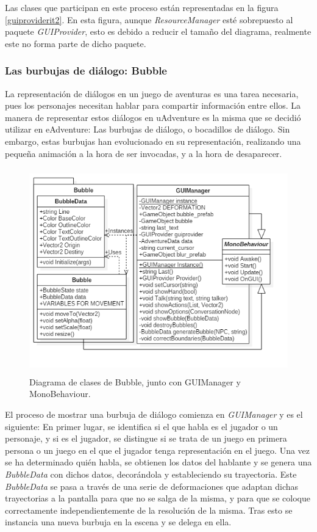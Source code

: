 Las clases que participan en este proceso están representadas en la figura \ref{guiproviderit2}. En esta figura, aunque \textit{ResourceManager} esté sobrepuesto al paquete \textit{GUIProvider}, esto es debido a reducir el tamaño del diagrama, realmente este no forma parte de dicho paquete.

\subsubsection{Las burbujas de diálogo: Bubble}

La representación de diálogos en un juego de aventuras es una tarea necesaria, pues los personajes necesitan hablar para compartir información entre ellos. La manera de representar estos diálogos en uAdventure es la misma que se decidió utilizar en eAdventure: Las burbujas de diálogo, o bocadillos de diálogo. Sin embargo, estas burbujas han evolucionado en su representación, realizando una pequeña animación a la hora de ser invocadas, y a la hora de desaparecer.

\begin{figure}[h!]
	\centerline{\includegraphics[height=3.5in]{figures/it2/Bubble.png}}
	\caption[Bubble - Versión Final]{Diagrama de clases de Bubble, junto con GUIManager y MonoBehaviour.}
	\label{bubbleit2}
\end{figure}

El proceso de mostrar una burbuja de diálogo comienza en \textit{GUIManager} y es el siguiente: En primer lugar, se identifica si el que habla es el jugador o un personaje, y si es el jugador, se distingue si se trata de un juego en primera persona o un juego en el que el jugador tenga representación en el juego. Una vez se ha determinado quién habla, se obtienen los datos del hablante y se genera una \textit{BubbleData} con dichos datos, decorándola y estableciendo su trayectoria. Este \textit{BubbleData} se pasa a través de una serie de deformaciones que adaptan dichas trayectorias a la pantalla para que no se salga de la misma, y para que se coloque correctamente independientemente de la resolución de la misma. Tras esto se instancia una nueva burbuja en la escena y se delega en ella.

